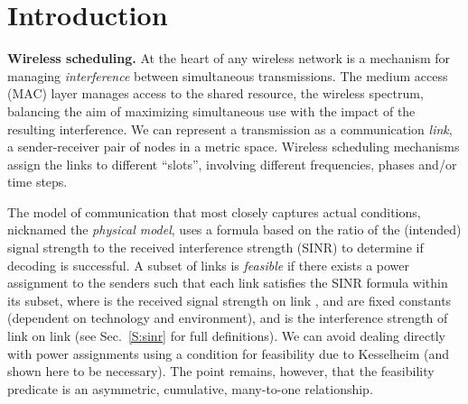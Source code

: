 \documentclass[11pt]{article}
\newcommand{\mypara}[1]{\smallskip\noindent\textbf{#1.}}  \newcommand{\tightpara}[1]{\noindent\textbf{#1.}}
\begin{document}
\section{Introduction}

\mypara{Wireless scheduling} At the heart of any wireless network is a mechanism for managing \emph{interference}
between simultaneous transmissions.  The medium access (MAC) layer manages access to the shared resource, the wireless
spectrum, balancing the aim of maximizing simultaneous use with the impact of the resulting interference.  We can
represent a transmission as a communication \emph{link}, a sender-receiver pair of nodes in a metric space.  Wireless
scheduling mechanisms assign the links to different ``slots'', involving different frequencies, phases and/or time steps.

The model of communication that most closely captures actual conditions, nicknamed the \emph{physical model}, uses a
formula based on the ratio of the (intended) signal strength to the received interference strength (SINR) to determine
if decoding is successful.  A subset  of links is \emph{feasible} if there exists a power assignment to the senders
such that each link  satisfies the SINR formula  within its
subset, where  is the received signal strength on link ,  and  are fixed constants (dependent on
technology and environment), and  is the interference strength of link  on link  \cite{kumar00} (see
Sec.~\ref{S:sinr} for full definitions). We can avoid dealing directly with power assignments using a condition for
feasibility due to Kesselheim \cite{kesselheimconstantfactor} (and shown here to be necessary).  The point remains, however,
that the feasibility predicate is an asymmetric, cumulative, many-to-one relationship.
\end{document}
